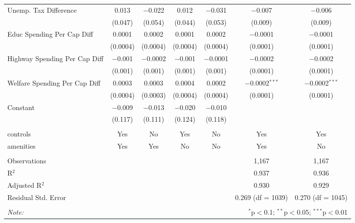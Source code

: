 \begin{table}[!htbp]
\begin{tabular}{@{\extracolsep{5pt}}lcccccc}
  Unemp. Tax Difference & 0.013 & $-$0.022 & 0.012 & $-$0.031 & $-$0.007 & $-$0.006 \\ 
  & (0.047) & (0.054) & (0.044) & (0.053) & (0.009) & (0.009) \\ 
  Educ Spending Per Cap Diff & 0.0001 & 0.0002 & 0.0001 & 0.0002 & $-$0.0001 & $-$0.0001 \\ 
  & (0.0004) & (0.0004) & (0.0004) & (0.0004) & (0.0001) & (0.0001) \\ 
  Highway Spending Per Cap Diff & $-$0.001 & $-$0.0002 & $-$0.001 & $-$0.0001 & $-$0.0002 & $-$0.0002 \\ 
  & (0.001) & (0.001) & (0.001) & (0.001) & (0.0001) & (0.0001) \\ 
  Welfare Spending Per Cap Diff & 0.0003 & 0.0003 & 0.0004 & 0.0002 & $-$0.0002$^{***}$ & $-$0.0002$^{***}$ \\ 
  & (0.0004) & (0.0003) & (0.0004) & (0.0004) & (0.0001) & (0.0001) \\ 
  Constant & $-$0.009 & $-$0.013 & $-$0.020 & $-$0.010 &  &  \\ 
  & (0.117) & (0.111) & (0.124) & (0.118) &  &  \\ 
 \hline \\[-1.8ex] 
controls & Yes & No & Yes & No & Yes & Yes \\ 
amenities & Yes & Yes & No & No & Yes & No \\ 
\hline \\[-1.8ex] 
Observations &  &  &  &  & 1,167 & 1,167 \\ 
R$^{2}$ &  &  &  &  & 0.937 & 0.936 \\ 
Adjusted R$^{2}$ &  &  &  &  & 0.930 & 0.929 \\ 
Residual Std. Error &  &  &  &  & 0.269 (df = 1039) & 0.270 (df = 1045) \\ 
\hline 
\hline \\[-1.8ex] 
\textit{Note:}  & \multicolumn{6}{r}{$^{*}$p$<$0.1; $^{**}$p$<$0.05; $^{***}$p$<$0.01} \\ 
\end{tabular} 
\end{table} 
